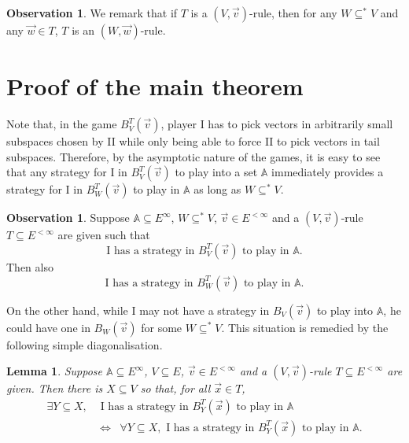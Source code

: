 \documentclass[10pt]{amsart}
\newcommand {\A}{\mathbb A}
\newcommand{\equi}{\Longleftrightarrow}
\newcommand {\e} {\exists}
\renewcommand {\a} {\forall}
\newtheorem{lemme}[thm]{Lemma}
\theoremstyle{definition}
\newtheorem{obs}[thm] {Observation}
\begin{document}
 

\begin{obs}We remark that if $T$ is a $(V,\vec v)$-rule, then for any $W\subseteq^*V$ and any $\vec w\in T$,  $T$ is an $(W,\vec w)$-rule.\end{obs}



\section{Proof of the main theorem}
Note that, in the game $B^T_V(\vec v)$, player I has to pick vectors in arbitrarily small subspaces chosen by II while only being able to force II to pick vectors in tail subspaces. Therefore, by the asymptotic nature of the games, it is easy to see that any strategy for I in $B^T_V({\vec v})$ to play into a set $\A$ immediately provides a strategy for I in $B^T_W(\vec v)$ to play in $\A$ as long as $W\subseteq ^*V$.

\begin{obs}\label{hered}
Suppose $\A\subseteq E^\infty$, $W\subseteq^*V$, $\vec v\in E^{<\infty}$ and a $(V,\vec v)$-rule $T\subseteq E^{<\infty}$ are given such that
$$
\text{I has a strategy in $B^T_V(\vec v)$ to play in $\A$}.
$$
Then also
$$
\text{I has a strategy in $B^T_W(\vec v)$ to play in $\A$}.
$$
\end{obs}
On the other hand, while I may not have a strategy in $B_V(\vec v)$ to play into $\A$, he could have one in $B_W(\vec v)$ for some $W\subseteq^*V$. This situation is remedied by the following simple diagonalisation.


\begin{lemme}\label{diag}
Suppose $\A\subseteq E^\infty$, $V\subseteq E$, $\vec v\in E^{<\infty}$ and a $(V,\vec v)$-rule $T\subseteq E^{<\infty}$ are given. Then there is $X\subseteq V$ so that, for all $\vec x\in T$,
\[\begin{split}
\e Y\subseteq X, &\text{ I has a strategy in $B^T_Y(\vec x)$ to play in $\A$ }\\
&
\equi\;\;
\a Y\subseteq X, \text{ I has a strategy in $B^T_Y(\vec x)$ to play in $\A$}.
\end{split}\]
\end{lemme}
\end{document}
